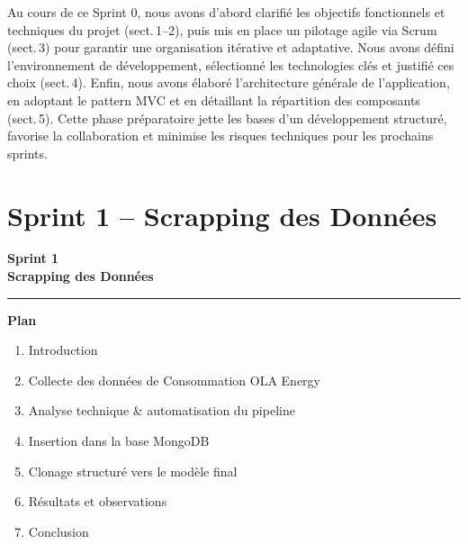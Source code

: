 \documentclass[a4paper,11pt]{report}
\begin{document}
Au cours de ce Sprint 0, nous avons d’abord clarifié les objectifs fonctionnels et techniques du projet (sect. 1–2), puis mis en place un pilotage agile via Scrum (sect. 3) pour garantir une organisation itérative et adaptative. Nous avons défini l’environnement de développement, sélectionné les technologies clés et justifié ces choix (sect. 4). Enfin, nous avons élaboré l’architecture générale de l’application, en adoptant le pattern MVC et en détaillant la répartition des composants (sect. 5). Cette phase préparatoire jette les bases d’un développement structuré, favorise la collaboration et minimise les risques techniques pour les prochains sprints.



\newpage

\chapter{Sprint 1 -- Scrapping des Données}
\thispagestyle{empty}
\vspace{2cm}
\begin{center}
  {\Huge\bfseries Sprint 1}\\[0.8em]
  {\LARGE\bfseries Scrapping des Données}
\end{center}

\vspace{1.5cm}
\begin{center}
  \color{blue!60!black}\rule{0.6\textwidth}{1pt}
\end{center}
\vspace{1.5cm}

\begin{center}
  {\huge\bfseries Plan}\\[0.5em]
 
\end{center}
\vspace{1em}

\begin{enumerate}[%
  label=\bfseries\Large\arabic*., 
  leftmargin=2cm, 
  itemsep=1em,
  start=1
]
  \item Introduction
  \item Collecte des données de Consommation OLA Energy
  \item Analyse technique \& automatisation du pipeline
  \item Insertion dans la base MongoDB
  \item Clonage structuré vers le modèle final
  \item Résultats et observations
  \item Conclusion
\end{enumerate}
\end{document}
